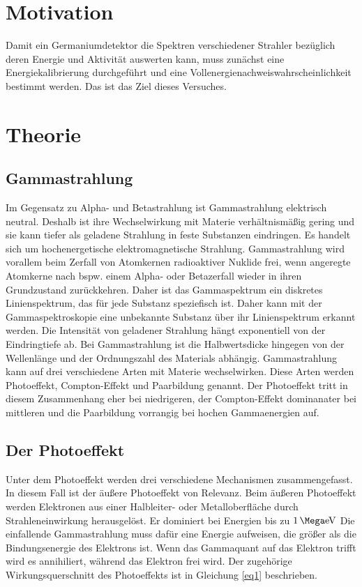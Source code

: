 \section{Motivation}
Damit ein Germaniumdetektor die Spektren verschiedener Strahler bezüglich deren
Energie und Aktivität auswerten kann, muss zunächst eine Energiekalibrierung 
durchgeführt und
eine Vollenergienachweiswahrscheinlichkeit bestimmt werden. 
Das ist das Ziel dieses Versuches.

\section{Theorie}
\label{sec:Theorie}

\subsection{Gammastrahlung}
Im Gegensatz zu Alpha- und Betastrahlung ist Gammastrahlung elektrisch neutral. 
Deshalb ist ihre Wechselwirkung mit Materie verhältnismäßig gering und sie 
kann tiefer als geladene Strahlung in feste Substanzen eindringen.
Es handelt sich um hochenergetische elektromagnetische Strahlung.
Gammastrahlung wird vorallem beim Zerfall von Atomkernen radioaktiver Nuklide frei, 
wenn angeregte Atomkerne nach bspw. einem Alpha- oder Betazerfall wieder in ihren 
Grundzustand zurückkehren.
Daher ist das Gammaspektrum ein diskretes Linienspektrum, das für jede Substanz 
speziefisch ist. Daher kann mit der Gammaspektroskopie eine unbekannte Substanz über 
ihr Linienspektrum erkannt werden.
Die Intensität von geladener Strahlung hängt exponentiell von der 
Eindringtiefe ab. Bei Gammastrahlung ist die Halbwertsdicke hingegen 
von der Wellenlänge und der Ordnungszahl des Materials abhängig.
Gammastrahlung kann auf drei verschiedene Arten mit Materie wechselwirken.
Diese Arten werden Photoeffekt, Compton-Effekt und Paarbildung genannt.
Der Photoeffekt tritt in diesem Zusammenhang eher bei niedrigeren, der 
Compton-Effekt dominanater bei mittleren und die Paarbildung vorrangig
bei hochen Gammaenergien auf.

\subsection{Der Photoeffekt}
Unter dem Photoeffekt werden drei verschiedene Mechanismen zusammengefasst.
In diesem Fall ist der äußere Photoeffekt von Relevanz.
Beim äußeren Photoeffekt werden Elektronen aus einer Halbleiter- oder Metalloberfläche 
durch Strahleneinwirkung herausgelöst. 
Er dominiert bei Energien bis zu $\SI{1}{\Mega\electronvolt}$
Die einfallende Gammastrahlung muss dafür eine Energie aufweisen, die größer als die 
Bindungsenergie des Elektrons ist. Wenn das Gammaquant auf das Elektron trifft wird es 
annihiliert, während das Elektron frei wird. Der zugehörige 
Wirkungsquerschnitt des Photoeffekts ist in Gleichung \ref{eq1} beschrieben.

